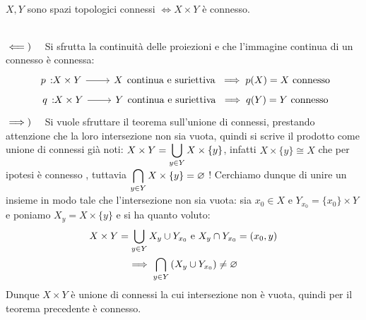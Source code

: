 \begin{theorema}~{}\label{prodotto connessi}\\
$X, Y$ sono spazi topologici connessi $\iff X\times Y$ è connesso.	
\end{theorema}
\begin{demonstration}~{}\\
	$\impliedby)\quad$ Si sfrutta la continuità delle proiezioni e che l'immagine continua di un connesso è connessa:
		\begin{gather*}
			\funz p {X\times Y} X \text{continua e suriettiva } \implies p(X)=X \text{ connesso}\\
			\funz q {X\times Y} Y \text{continua e suriettiva } \implies q(Y)=Y \text{ connesso}	
		\end{gather*}	
	$\implies)\quad$ Si vuole sfruttare il teorema sull'unione di connessi, prestando attenzione che la loro intersezione non sia vuota, quindi si scrive il prodotto come unione di connessi già noti:
	$\displaystyle X\times Y=\mathop{{\bigcup}}\displaylimits_{y\in Y}X\times\{y\}$, infatti $X\times\{y\}\cong X$ che per ipotesi è connesso , tuttavia $\displaystyle\mathop{{\bigcap}}\displaylimits_{y\in Y}X\times\{y\}=\varnothing$ !\newline
	Cerchiamo dunque di unire un insieme in modo tale che l'intersezione non sia vuota: sia $x_0\in X$ e $Y_{x_0}=\{x_0\}\times Y$ e poniamo $X_y=X\times\{y\}$ e si ha quanto voluto:
		\begin{gather*}
			X\times Y=\mathop{{\bigcup}}\displaylimits_{y\in Y}X_y \cup Y_{x_0} \text{ e } X_y\cap Y_{x_0}=(x_0,y)\\
			\implies \mathop{{\bigcap}}\displaylimits_{y\in Y}\left( X_y  \cup Y_{x_0}\right)\neq\varnothing		
		\end{gather*}
	Dunque $X\times Y$ è unione di connessi la cui intersezione non è vuota, quindi per il teorema precedente è connesso.
\end{demonstration}
